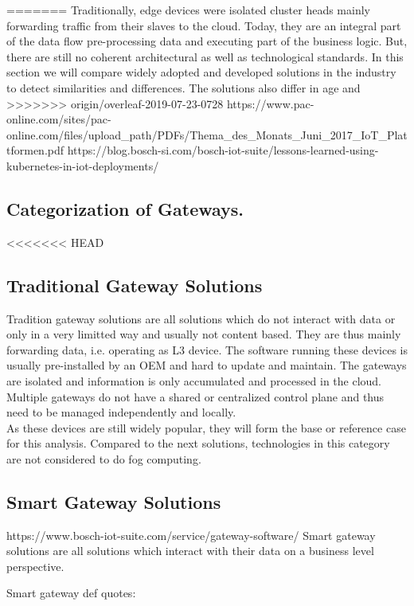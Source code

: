 =======
Traditionally, edge devices were isolated cluster heads mainly forwarding traffic from their slaves to the cloud. Today, they are an integral part of the data flow pre-processing data and executing part of the business logic. But, there are still no coherent architectural as well as technological standards. In this section we will compare widely adopted and developed solutions in the industry to detect similarities and differences. The solutions also differ in age and 
>>>>>>> origin/overleaf-2019-07-23-0728
https://www.pac-online.com/sites/pac-online.com/files/upload_path/PDFs/Thema_des_Monats_Juni_2017_IoT_Plattformen.pdf
https://blog.bosch-si.com/bosch-iot-suite/lessons-learned-using-kubernetes-in-iot-deployments/

\subsection{Categorization of Gateways.}

<<<<<<< HEAD

\subsection{Traditional Gateway Solutions}
Tradition gateway solutions are all solutions which do not interact with data or only in a very limitted way and usually not content based. They are thus mainly forwarding data, i.e. operating as L3 device. The software running these devices is usually pre-installed by an OEM and hard to update and maintain. The gateways are isolated and information is only accumulated and processed in the cloud. Multiple gateways do not have a shared or centralized control plane and thus need to be managed independently and locally.\\
As these devices are still widely popular, they will form the base or reference case for this analysis. Compared to the next solutions, technologies in this category are not considered to do fog computing.


\subsection{Smart Gateway Solutions}
https://www.bosch-iot-suite.com/service/gateway-software/
Smart gateway solutions are all solutions which interact with their data on a business level perspective.

Smart gateway def  quotes:

